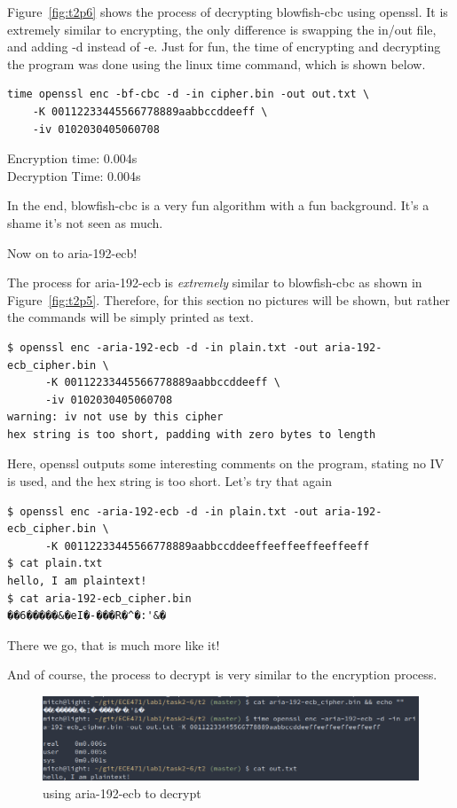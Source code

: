 \documentclass[12pt]{article}
\begin{document}
Figure~\ref{fig:t2p6} shows the process of decrypting blowfish-cbc using openssl. 
It is extremely similar to encrypting, the only difference is swapping the in/out file, and adding -d 
instead of -e. Just for fun, the time of encrypting and decrypting the program was done using the linux
time command, which is shown below.

\begin{verbatim}
time openssl enc -bf-cbc -d -in cipher.bin -out out.txt \
    -K 00112233445566778889aabbccddeeff \
    -iv 0102030405060708
\end{verbatim}

Encryption time: 0.004s\\
Decryption Time: 0.004s

In the end, blowfish-cbc is a very fun algorithm with a fun background. It's a shame it's not seen as
much.


Now on to aria-192-ecb!

The process for aria-192-ecb is \emph{extremely} similar to blowfish-cbc as shown in
Figure~\ref{fig:t2p5}. 
Therefore, for this section no pictures will be shown, but rather the commands will be simply printed
as text.

\begin{verbatim}
$ openssl enc -aria-192-ecb -d -in plain.txt -out aria-192-ecb_cipher.bin \
      -K 00112233445566778889aabbccddeeff \
      -iv 0102030405060708
warning: iv not use by this cipher
hex string is too short, padding with zero bytes to length
\end{verbatim}

Here, openssl outputs some interesting comments on the program, stating no IV is used, 
and the hex string is too short. Let's try that again

\begin{verbatim}
$ openssl enc -aria-192-ecb -d -in plain.txt -out aria-192-ecb_cipher.bin \
      -K 00112233445566778889aabbccddeeffeeffeeffeeffeeff
$ cat plain.txt
hello, I am plaintext!
$ cat aria-192-ecb_cipher.bin
��6�����&�eI�-���R�^�:'&�
\end{verbatim}

There we go, that is much more like it!

And of course, the process to decrypt is very similar to the encryption process.

\begin{figure}[H]
    \begin{center}
        \includegraphics[scale=0.48]{t2p7.png}
    \end{center}{}
    \caption{using aria-192-ecb to decrypt}
    \label{fig:t2p7}
\end{figure}
\end{document}
